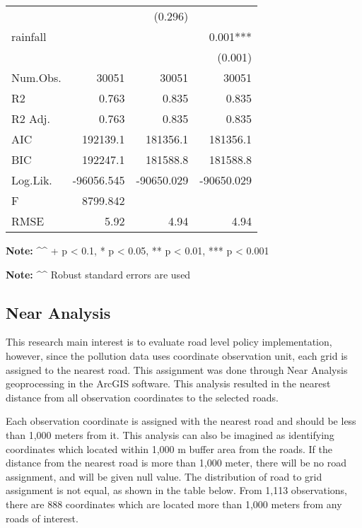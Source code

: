 \documentclass[
]{article}
\begin{document}
\begin{longtable}[]{@{}lrrr@{}}
& & (0.296) & \\
rainfall & & & 0.001*** \\
& & & (0.001) \\
Num.Obs. & 30051 & 30051 & 30051 \\
R2 & 0.763 & 0.835 & 0.835 \\
R2 Adj. & 0.763 & 0.835 & 0.835 \\
AIC & 192139.1 & 181356.1 & 181356.1 \\
BIC & 192247.1 & 181588.8 & 181588.8 \\
Log.Lik. & -96056.545 & -90650.029 & -90650.029 \\
F & 8799.842 & & \\
RMSE & 5.92 & 4.94 & 4.94 \\
\end{longtable}

\textbf{Note:} \^{}\^{} + p \textless{} 0.1, * p \textless{} 0.05, ** p
\textless{} 0.01, *** p \textless{} 0.001

\textbf{Note:} \^{}\^{} Robust standard errors are used

\hypertarget{near-analysis}{%
\subsection{Near Analysis}\label{near-analysis}}

This research main interest is to evaluate road level policy
implementation, however, since the pollution data uses coordinate
observation unit, each grid is assigned to the nearest road. This
assignment was done through Near Analysis geoprocessing in the ArcGIS
software. This analysis resulted in the nearest distance from all
observation coordinates to the selected roads.

Each observation coordinate is assigned with the nearest road and should
be less than 1,000 meters from it. This analysis can also be imagined as
identifying coordinates which located within 1,000 m buffer area from
the roads. If the distance from the nearest road is more than 1,000
meter, there will be no road assignment, and will be given null value.
The distribution of road to grid assignment is not equal, as shown in
the table below. From 1,113 observations, there are 888 coordinates
which are located more than 1,000 meters from any roads of interest.
\end{document}
